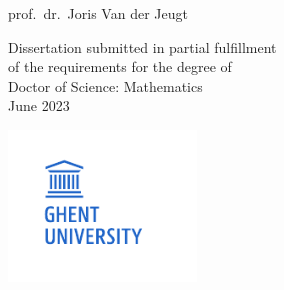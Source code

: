 \begin{titlepage}
\begin{center}
\begin{minipage}{45mm}
            prof.\ dr.\ Joris Van der Jeugt
        \end{minipage}
    \end{center}

    \vfill

    \begin{flushleft}
        Dissertation submitted in partial fulfillment\\
        of the requirements for the degree of \\
        Doctor of Science: Mathematics\\\vspace{3mm}
        June 2023
    \end{flushleft}

    \vspace{0cm}

    \begin{center}
    \end{center}

    \begin{minipage}{5cm}
        \hspace{-1cm}\includegraphics[width=5cm]{img/logo_ugent.pdf}
    \end{minipage}%
    \hfill%

\end{titlepage}
\restoregeometry
